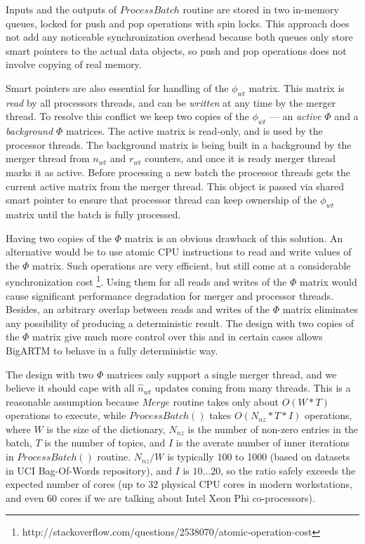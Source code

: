 \documentclass{llncs}
\begin{document}
Inputs and the outputs of $ProcessBatch$ routine are stored in two in-memory queues,
locked for push and pop operations with spin locks.
This approach does not add any noticeable synchronization overhead because
both queues only store smart pointers to the actual data objects,
so push and pop operations does not involve copying of real memory.

Smart pointers are also essential for handling of the $\phi_{wt}$ matrix.
This matrix is \emph{read} by all processors threads, and can be \emph{written} at any time by the merger thread.
To resolve this conflict we keep two copies of the $\phi_{wt}$ --- an \emph{active $\Phi$} and a \emph{background $\Phi$} matrices.
The active matrix is read-only, and is used by the processor threads.
The background matrix is being built in a background by the merger thread from $n_{wt}$ and $r_{wt}$ counters,
and once it is ready merger thread marks it as active.
Before processing a new batch the processor threads gets the current active matrix from the merger thread.
This object is passed via shared smart pointer to ensure that processor thread can keep ownership of the $\phi_{wt}$ matrix
until the batch is fully processed.

Having two copies of the $\Phi$ matrix is an obvious drawback of this solution.
An alternative would be to use atomic CPU instructions to read and write values of the $\Phi$ matrix.
Such operations are very efficient, but still come at a considerable synchronization cost
\footnote{http://stackoverflow.com/questions/2538070/atomic-operation-cost}.
Using them for all reads and writes of the $\Phi$ matrix would cause significant performance degradation for merger and processor threads.
Besides, an arbitrary overlap between reads and writes of the $\Phi$ matrix eliminates any possibility of producing a deterministic result.
The design with two copies of the $\Phi$ matrix give much more control over this
and in certain cases allows BigARTM to behave in a fully deterministic way.

The design with two $\Phi$ matrices only support a single merger thread,
and we believe it should cape with all $\hat n_{wt}$ updates coming from many threads.
This is a reasonable assumption because
$Merge$ routine takes only about $O(W * T)$ operations to execute, while
$ProcessBatch()$ takes $O(N_{nz} * T * I)$ operations,
where
$W$ is the size of the dictionary,
$N_{nz}$ is the number of non-zero entries in the batch,
$T$ is the number of topics,
and $I$ is the averate number of inner iterations in $ProcessBatch()$ routine.
$N_{nz} / W$ is typically 100 to 1000 (based on datasets in UCI Bag-Of-Words repository),
and $I$ is $10 \dots 20$, so the ratio safely exceeds the expected number of cores
(up to 32 physical CPU cores in modern workstations, and even 60 cores if we are talking about Intel Xeon Phi co-processors).
\end{document}
